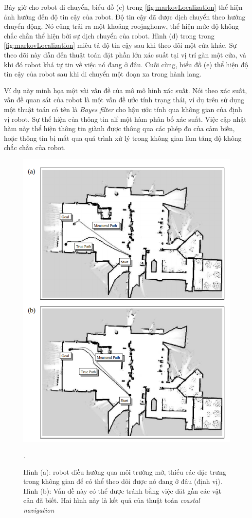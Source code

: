 Bây giờ cho robot di chuyển, biểu đồ (c) trong \figurename{\ref{fig:markovLocalization}} thể hiện ảnh hưởng đến độ tin cậy của robot. Độ tin cậy đã được dịch chuyển theo hướng chuyển động. Nó cũng trải ra một khoảng roojnghonw, thể hiện mức độ không chắc chắn thể hiện bởi sự dịch chuyển của robot. Hình (d) trong trong \figurename{\ref{fig:markovLocalization}} miêu tả độ tin cậy sau khi theo dõi một cửa khác. Sự theo dõi này dẫn đến thuật toán đặt phần lớn xác suất tại vị trí gàn một cửa, và khi đó robot khá tự tin về việc nó đang ở đâu. Cuối cùng, biểu đồ (e) thể hiện độ tin cậy của robot sau khi di chuyển một đoạn xa trong hành lang. 

Ví dụ này minh họa một vài vấn đề của mô mô hình xác suất. Nói theo xác suất, vấn đề quan sát của robot là một vấn đề ước tính trạng thái, ví dụ trên sử dụng một thuật toán có tên là \textit{Bayes filter} cho hậu ước tính qua không gian của định vị robot. Sự thể hiện của thông tin alf một hàm phân bố xác suất. Việc cập nhật hàm này thể hiện thông tin giành được thông qua các phép đo của cảm biến, hoặc thông tin bị mất qua quá trình xử lý trong không gian làm tăng độ không chắc chắn của robot. 

\begin{figure}[htbp]
  \centering
  \includegraphics[width=0.8\linewidth]{figures/coastal-Navigation.png}
  \caption{Hình (a): robot điều hướng qua môi trường mở, thiếu các đặc trưng trong không gian để có thể theo dõi được nó đang ở đâu (định vị). Hình (b): Vấn đề này có thể được tránh bằng việc đăt gần các vật cản đã biết. Hai hình này là kết quả của thuật toán \textit{coastal navigation} \cite{thrun2005probabilistic}}.
  \label{fig:coastalNavigation}
\end{figure}

